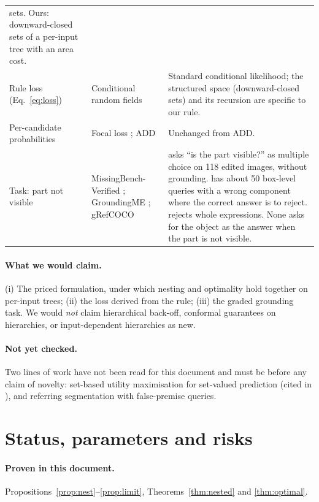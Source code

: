 \documentclass[11pt,a4paper]{article}
\theoremstyle{definition}
\theoremstyle{remark}
\begin{document}
\begin{center}
\begin{tabular}{L{3.0cm}L{5.5cm}L{6.3cm}}
sets. Ours: downward-closed sets of a per-input tree with an area cost. \\
Rule loss (Eq.~\ref{eq:loss}) & Conditional random fields \cite{crf} & Standard conditional likelihood; the
structured space (downward-closed sets) and its recursion are specific to our rule. \\
Per-candidate probabilities & Focal loss \cite{focal}; ADD \cite{add} & Unchanged from ADD. \\
Task: part not visible & MissingBench-Verified \cite{missing}; GroundingME \cite{groundingme}; gRefCOCO \cite{gres} &
\cite{missing} asks ``is the part visible?'' as multiple choice on 118 edited images, without grounding.
\cite{groundingme} has about 50 box-level queries with a wrong component where the correct answer is to reject.
\cite{gres} rejects whole expressions. None asks for the object as the answer when the part is not visible. \\
\bottomrule
\end{tabular}
\end{center}

\paragraph{What we would claim.} (i) The priced formulation, under which nesting and optimality hold together on
per-input trees; (ii) the loss derived from the rule; (iii) the graded grounding task. We would \emph{not} claim
hierarchical back-off, conformal guarantees on hierarchies, or input-dependent hierarchies as new.

\paragraph{Not yet checked.} Two lines of work have not been read for this document and must be before any claim of
novelty: set-based utility maximisation for set-valued prediction (cited in \cite{mortier22}), and referring
segmentation with false-premise queries.

\section{Status, parameters and risks}
\label{sec:status}
\paragraph{Proven in this document.} Propositions~\ref{prop:nest}--\ref{prop:limit}, Theorems~\ref{thm:nested} and
\ref{thm:optimal}.
\end{document}
